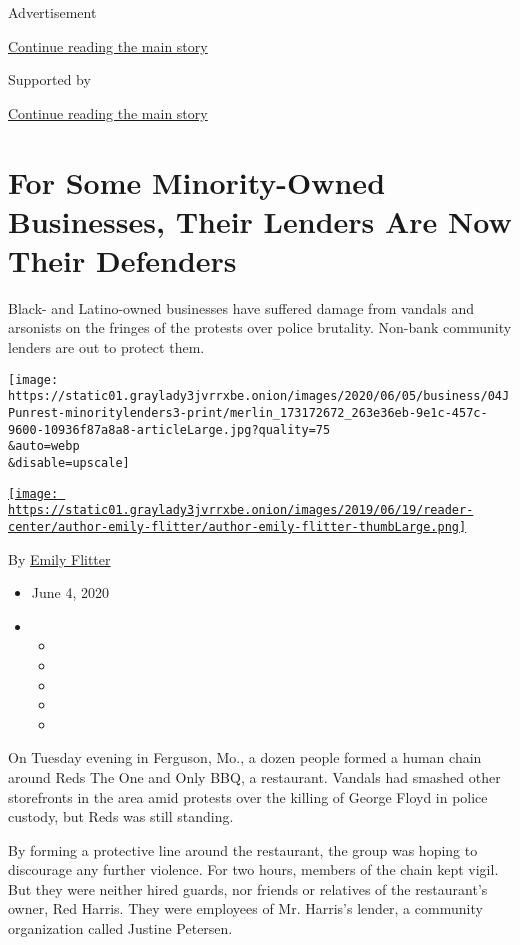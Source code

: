 Advertisement

\protect\hyperlink{after-top}{Continue reading the main story}

Supported by

\protect\hyperlink{after-sponsor}{Continue reading the main story}

\hypertarget{for-some-minority-owned-businesses-their-lenders-are-now-their-defenders}{%
\section{For Some Minority-Owned Businesses, Their Lenders Are Now Their
Defenders}\label{for-some-minority-owned-businesses-their-lenders-are-now-their-defenders}}

Black- and Latino-owned businesses have suffered damage from vandals and
arsonists on the fringes of the protests over police brutality. Non-bank
community lenders are out to protect them.

\texttt{[image: https://static01.graylady3jvrrxbe.onion/images/2020/06/05/business/04JPunrest-minoritylenders3-print/merlin\_173172672\_263e36eb-9e1c-457c-9600-10936f87a8a8-articleLarge.jpg?quality=75\\\&auto=webp\\\&disable=upscale]}

\href{https://www.nytimes3xbfgragh.onion/by/emily-flitter}{\texttt{[image: https://static01.graylady3jvrrxbe.onion/images/2019/06/19/reader-center/author-emily-flitter/author-emily-flitter-thumbLarge.png]}}

By \href{https://www.nytimes3xbfgragh.onion/by/emily-flitter}{Emily
Flitter}

\begin{itemize}
\item
  June 4, 2020
\item
  \begin{itemize}
  \item
  \item
  \item
  \item
  \item
  \end{itemize}
\end{itemize}

On Tuesday evening in Ferguson, Mo., a dozen people formed a human chain
around Reds The One and Only BBQ, a restaurant. Vandals had smashed
other storefronts in the area amid protests over the killing of George
Floyd in police custody, but Reds was still standing.

By forming a protective line around the restaurant, the group was hoping
to discourage any further violence. For two hours, members of the chain
kept vigil. But they were neither hired guards, nor friends or relatives
of the restaurant's owner, Red Harris. They were employees of Mr.
Harris's lender, a community organization called Justine Petersen.

